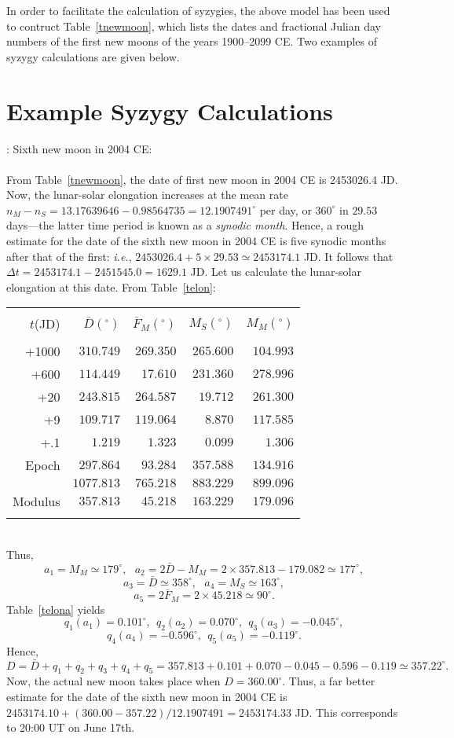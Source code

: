 In order to facilitate the calculation of syzygies, the above model has been used to contruct Table~\ref{tnewmoon}, which lists
the dates and fractional Julian day numbers of the first new moons of the years 1900--2099 CE. Two examples
of syzygy calculations are given below.

\section{Example Syzygy Calculations}
: Sixth new moon in 2004 CE:\\
~\\
From Table~\ref{tnewmoon}, the date of first new moon in 2004 CE is 2453026.4 JD. Now, the
lunar-solar elongation increases at the mean rate $n_M - n_S = 13.17639646-0.98564735=12.1907491^\circ$ per day, or
$360^\circ$ in $29.53$ days---the latter  time period is known as a {\em synodic month}. Hence, a rough estimate for the
date of the sixth new moon in 2004 CE is five synodic months after that of the first: {\em i.e.}, $2453026.4
+ 5\times 29.53\simeq 2453174.1$ JD. It follows that $\Delta t = 2453174.1-2451545.0=1629.1$ JD. Let us calculate the lunar-solar elongation at this date.
From Table~\ref{telon}:\\
\begin{tabular}{rrrrr}
&&&&\\
$t$(JD) & $ \bar{D}(^\circ)$ & $\bar{F}_M(^\circ)$ & $M_S(^\circ)$ & $M_M(^\circ)$\\[-2ex]
&&&&\\
+1000 & $310.749$ & $269.350$ & $265.600$ & $104.993$\\
+600 & $114.449$ & $17.610$ & $231.360$ & $278.996$\\
+20 & $243.815$ & $264.587$ & $19.712$ & $261.300$\\
+9 & $109.717$ & $119.064$ & $8.870$ & $117.585$\\
+.1 & $1.219$ & $1.323$ & $0.099$ & $1.306$\\
Epoch & $297.864$ & $93.284$ & $357.588$ & $134.916$\\\cline{2-5}
&$1077.813$ & $765.218$ & $883.229$ & $899.096$\\\cline{2-5}
Modulus & $357.813$ & $45.218$ &$163.229$ & $179.096$\\ 
&&&\\
\end{tabular}\\
Thus,
$$
a_1=M_M\simeq 179^\circ,~~~a_2=2\bar{D}-M_M = 2\times 357.813-179.082\simeq 177^\circ,
$$ 
$$
a_3=\bar{D}\simeq 358^\circ,~~~a_4 = M_S\simeq 163^\circ,
$$ 
$$
a_5=2\bar{F}_M = 2\times 45.218\simeq 90^\circ.
$$
Table~\ref{telona} yields $$
q_1(a_1)=0.101^\circ,~~q_2(a_2)= 0.070^\circ,~~q_3(a_3) = -0.045^\circ,
$$
$$q_4(a_4)=-0.596^\circ,~~q_5(a_5)= -0.119^\circ.
$$
 Hence,
$$
D = \bar{D} + q_1+q_2+q_3+q_4+q_5=357.813+0.101+0.070-0.045-0.596-0.119\simeq
357.22^\circ.
$$
Now, the actual new moon takes place when $D=360.00^\circ$. Thus, a far better estimate for the date 
of the sixth new moon in 2004 CE is $2453174.10 +(360.00-357.22)/12.1907491= 2453174.33$ JD.
This corresponds to 20:00 UT on June 17th.

